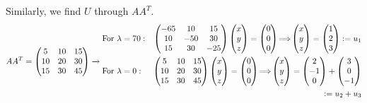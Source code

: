 \documentclass[12pt]{article}
\let\oldimplies\implies
\renewcommand*{\implies}{
	\hspace{-0.05cm}\resizebox{.95\width}{\height}{$\oldimplies$}\hspace{-0.05cm}
}
\begin{document}
 			Similarly, we find $U$ through $AA^{T}$.
 			$$ AA^{T} = \begin{pmatrix}
 				5 & 10 & 15 \\ 
 				10& 20 & 30 \\
 				15 & 30 & 45
 			\end{pmatrix} \xrightarrow{} \begin{align*}
 				\text{For } &\lambda = 70 : &\begin{pmatrix}
	 				-65 & 10 & 15 \\
	 				10 & -50 & 30 \\
	 				15 & 30 & -25
 				\end{pmatrix}\begin{pmatrix}
 					x \\ y \\z
 				\end{pmatrix} = \begin{pmatrix}
 					0 \\ 0 \\0
 				\end{pmatrix} \implies \begin{pmatrix}
 					x \\ y \\ z
 				\end{pmatrix} = \begin{pmatrix}
 					1 \\ 2 \\3
 				\end{pmatrix} :=  u_1\\ 
 				\text{For } &\lambda = 0 : &\begin{pmatrix}
 				5 & 10 & 15 \\ 
 				10& 20 & 30 \\
 				15 & 30 & 45
 				\end{pmatrix}\begin{pmatrix}
 					x \\ y \\ z
 				\end{pmatrix} = \begin{pmatrix}
 					0 \\ 0 \\ 0
 				\end{pmatrix} \implies \begin{pmatrix}
 					x \\ y \\ z
 				\end{pmatrix} = \begin{pmatrix}
 					2 \\ -1 \\ 0 
 				\end{pmatrix}+ \begin{pmatrix}
 					3 \\ 0 \\ -1
 				\end{pmatrix} \\
 				& &  :=u_2 + u_3
 			\end{align*}$$
\end{document}
